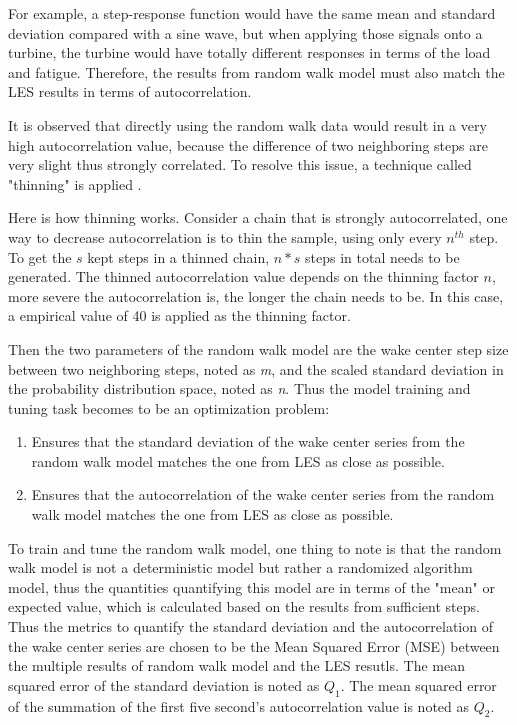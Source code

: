 \documentclass{umthesis}
\begin{document}
For example, a step-response function would have the same mean and standard deviation compared with a sine wave, but when applying those signals onto a turbine, the turbine would have totally different responses in terms of the load and fatigue. Therefore, the results from random walk model must also match the LES results in terms of autocorrelation.

It is observed that directly using the random walk data would result in a very high autocorrelation value, because the difference of two neighboring steps are very slight thus strongly correlated. To resolve this issue, a technique called "thinning" is applied \cite{thinning}.

Here is how thinning works. Consider a chain that is strongly autocorrelated, one way to decrease autocorrelation is to thin the sample, using only every $n^{th}$ step. To get the $s$ kept steps in a thinned chain, $n*s$ steps in total needs to be generated. The thinned autocorrelation value depends on the thinning factor $n$, more severe the autocorrelation is, the longer the chain needs to be. In this case, a empirical value of 40 is applied as the thinning factor.         

Then the two parameters of the random walk model are the wake center step size between two neighboring steps, noted as \textit{m}, and the scaled standard deviation in the probability distribution space, noted as \textit{n}. Thus the model training and tuning task becomes to be an optimization problem:

\begin{enumerate}
  \item Ensures that the standard deviation of the wake center series from the random walk model matches the one from LES as close as possible. 
  \item Ensures that the autocorrelation of the wake center series from the random walk model matches the one from LES as close as possible. 
\end{enumerate}

To train and tune the random walk model, one thing to note is that the random walk model is not a deterministic model but rather a randomized algorithm model, thus the quantities quantifying this model are in terms of the "mean" or expected value, which is calculated based on the results from sufficient steps. Thus the metrics to quantify the standard deviation and the autocorrelation of the wake center series are chosen to be the Mean Squared Error (MSE) between the multiple results of random walk model and the LES resutls. The mean squared error of the standard deviation is noted as $Q_1$. The mean squared error of the summation of the first five second’s autocorrelation value is noted as $Q_2$.
\end{document}
